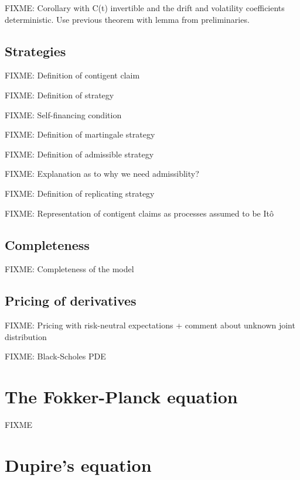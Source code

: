 \documentclass[a4paper]{article}
\begin{document}
FIXME: Corollary with C(t) invertible and the drift and volatility coefficients deterministic. Use previous theorem with lemma from preliminaries.

\subsection{Strategies}

FIXME: Definition of contigent claim

FIXME: Definition of strategy

FIXME: Self-financing condition

FIXME: Definition of martingale strategy

FIXME: Definition of admissible strategy

FIXME: Explanation as to why we need admissiblity?

FIXME: Definition of replicating strategy

FIXME: Representation of contigent claims as processes assumed to be It\^o

\subsection{Completeness}

FIXME: Completeness of the model

\subsection{Pricing of derivatives}

FIXME: Pricing with risk-neutral expectations + comment about unknown joint distribution

FIXME: Black-Scholes PDE

\section{The Fokker-Planck equation}


FIXME

\section{Dupire's equation}

\end{document}
